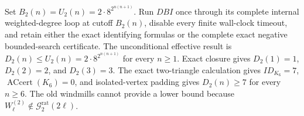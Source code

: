 Set \(B_2(n)=U_2(n)=2\cdot8^{2^{n(n+1)}}\).  Run \(DBI\) once through its complete internal weighted-degree loop at cutoff \(B_2(n)\), disable every finite wall-clock timeout, and retain either the exact identifying formulas or the complete exact negative bounded-search certificate.
The unconditional effective result is \(D_2(n)\leq U_2(n)=2\cdot8^{2^{n(n+1)}}\) for every \(n\geq1\).  Exact closure gives \(D_2(1)=1\), \(D_2(2)=2\), and \(D_2(3)=3\).  The exact two-triangle calculation gives \(ID_{K_6}=7\), \(\operatorname{ACcert}(K_6)=0\), and isolated-vertex padding gives \(D_2(n)\geq7\) for every \(n\geq6\).  The old windmills cannot provide a lower bound because \(W_{\ell}^{(2)}\notin\mathcal G_{2}^{\mathrm{rat}}(2\ell)\).
